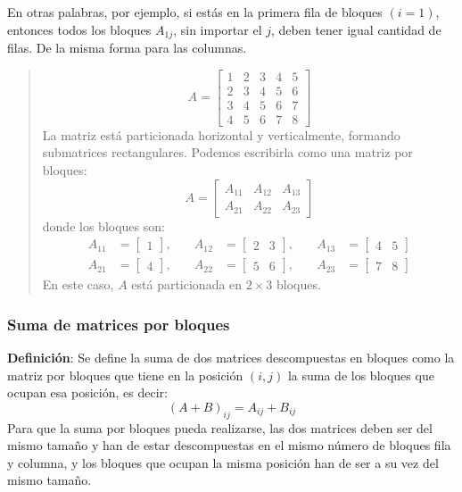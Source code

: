 En otras palabras, por ejemplo, si estás en la primera fila de bloques \((i=1)\), entonces todos los bloques \(A_{1j}\), sin importar el \(j\), deben tener igual cantidad de filas. De la misma forma para las columnas.

\begin{quote}
  \[
  A = \left[\begin{array}{c|cc|cc}
  1 & 2 & 3 & 4 & 5 \\
  2 & 3 & 4 & 5 & 6 \\
  3 & 4 & 5 & 6 & 7 \\
  \hline
  4 & 5 & 6 & 7 & 8
  \end{array}\right]
  \]
  La matriz está particionada horizontal y verticalmente, formando submatrices rectangulares. Podemos escribirla como una matriz por bloques:
  \[
  A = \begin{bmatrix}
  A_{11} & A_{12} & A_{13} \\
  A_{21} & A_{22} & A_{23}
  \end{bmatrix}
  \]
  donde los bloques son:
  \[
  \begin{aligned}
  A_{11} &= \begin{bmatrix} 1 \end{bmatrix}, \quad &
  A_{12} &= \begin{bmatrix} 2 & 3 \end{bmatrix}, \quad &
  A_{13} &= \begin{bmatrix} 4 & 5 \end{bmatrix} \\
  A_{21} &= \begin{bmatrix} 4 \end{bmatrix}, \quad &
  A_{22} &= \begin{bmatrix} 5 & 6 \end{bmatrix}, \quad &
  A_{23} &= \begin{bmatrix} 7 & 8 \end{bmatrix}
  \end{aligned}
  \]
  En este caso, \(A\) está particionada en \(2 \times 3\) bloques.
\end{quote}

\subsubsection{Suma de matrices por bloques}

\textbf{Definición}: Se define la suma de dos matrices descompuestas en bloques como la matriz por bloques que tiene en la posición \((i, j)\) la suma de los bloques que ocupan esa posición, es decir:
\[
 (A+B)_{ij} = A_{ij} + B_{ij}
\]
Para que la suma por bloques pueda realizarse, las dos matrices deben ser del mismo tamaño y han de estar descompuestas en el mismo número de bloques fila y columna, y los bloques que ocupan la misma posición han de ser a su vez del mismo tamaño.

